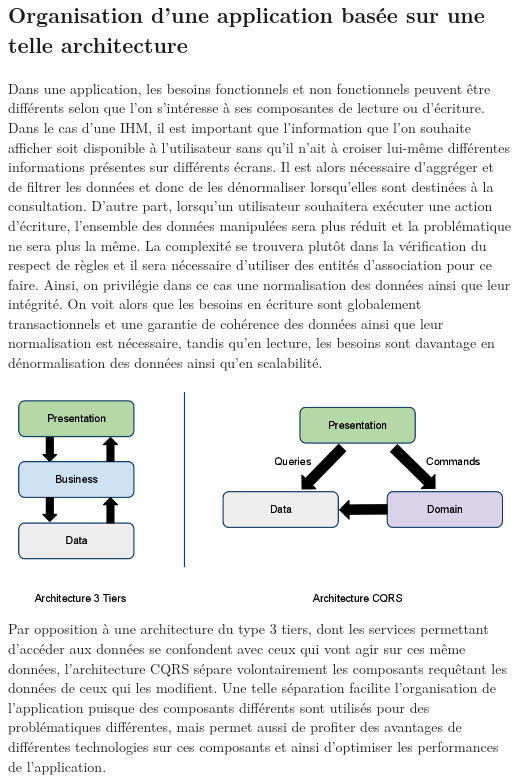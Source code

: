 \subsection{Organisation d'une application basée sur une telle architecture}
\paragraph{}
Dans une application, les besoins fonctionnels et non fonctionnels peuvent être différents selon que l'on s'intéresse à ses composantes de lecture ou d'écriture.
Dans le cas d'une IHM, il est important que l'information que l'on souhaite afficher soit disponible à l'utilisateur sans qu'il n'ait à croiser lui-même différentes informations présentes sur différents écrans.
Il est alors nécessaire d'aggréger et de filtrer les données et donc de les dénormaliser lorsqu'elles sont destinées à la consultation.
D'autre part, lorsqu'un utilisateur souhaitera exécuter une action d'écriture, l'ensemble des données manipulées sera plus réduit et la problématique ne sera plus la même.
La complexité se trouvera plutôt dans la vérification du respect de règles et il sera nécessaire d'utiliser des entités d'association pour ce faire.
Ainsi, on privilégie dans ce cas une normalisation des données ainsi que leur intégrité.
On voit alors que les besoins en écriture sont globalement transactionnels et une garantie de cohérence des données ainsi que leur normalisation est nécessaire, tandis qu'en lecture, les besoins sont davantage en dénormalisation des données ainsi qu'en scalabilité.
\paragraph{}
\includegraphics[scale=0.4]{Figures/Chapter3/architecture/tiersvscqrs.png}
Par opposition à une architecture du type 3 tiers, dont les services permettant d'accéder aux données se confondent avec ceux qui vont agir sur ces même données, l'architecture CQRS sépare volontairement les composants requêtant les données de ceux qui les modifient.
Une telle séparation facilite l'organisation de l'application puisque des composants différents sont utilisés pour des problématiques différentes, mais permet aussi de profiter des avantages de différentes technologies sur ces composants et ainsi d'optimiser les performances de l'application.
